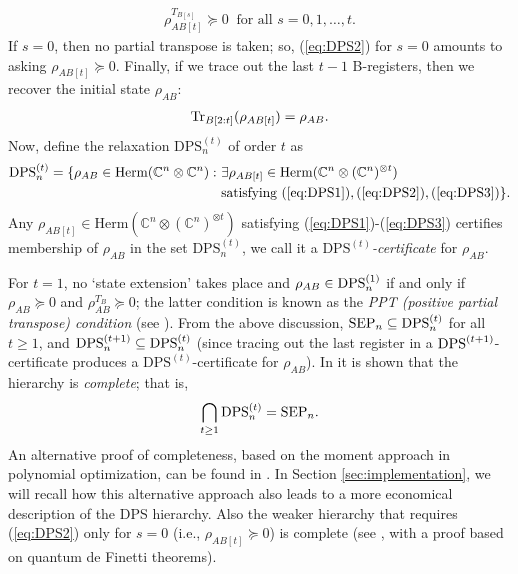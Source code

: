 \documentclass[11pt]{article}
\newcommand{\C}{\ensuremath{\mathbb{C}}} %
\newcommand{\Herm}{\mathrm{Herm}}
\newcommand{\Cnn}{\C^n\ot \C^n}
\newcommand{\Cnnt}{\C^n\ot (\C^n)^{\ot t}}
\newcommand{\SEP}{\text{\rm SEP}}
\newcommand{\DPS}{\text{\rm DPS}}
\newcommand{\DPSt}{\mathrm{DPS}^{(t)}}
\newcommand{\Tr}{\text{\rm Tr}}
\newcommand{\ot}{\otimes}
\theoremstyle{plain}
\begin{document}
\begin{align}\label{eq:DPS2}
\rho_{AB[t]}^{T_{B[s]}}\succeq 0  \ \text{ for all } s=0,1,\ldots,t.
\end{align}
If $s=0$, then  no partial transpose is taken; so, (\ref{eq:DPS2}) for $s=0$ amounts to asking $\rho_{AB[t]}\succeq 0$.
Finally, if we trace out the last $t-1$  B-registers, then we recover the initial state $\rho_{AB}$:
\begin{align}\label{eq:DPS3}
\Tr_{B[2:t]}(\rho_{AB[t]}) = \rho_{AB}.
\end{align}
 Now, define the relaxation $\DPSt_n$ of order $t$ as
 \begin{align}\label{eq:DPS}
 \begin{split}
 \DPSt_n=\{\rho_{AB}\in \Herm(\Cnn):  &\  \exists \rho_{AB[t]}\in \Herm (\Cnnt) \\
 &  \text{  satisfying }  (\ref{eq:DPS1}),  (\ref{eq:DPS2}), (\ref{eq:DPS3})\}.
  \end{split}
  \end{align}
Any $\rho_{AB[t]}\in\Herm(\Cnnt)$  satisfying  (\ref{eq:DPS1})-(\ref{eq:DPS3}) certifies membership of $\rho_{AB}$ in the set $\DPSt_n$, we call it  a {\em $\DPSt$-certificate} for $\rho_{AB}$. 

For $t=1$, no `state extension' takes place and $\rho_{AB}\in\DPS^{(1)}_n$ if and only if $\rho_{AB}\succeq 0$ and $\rho_{AB}^{T_B}\succeq 0$; the latter condition is known as the {\em PPT (positive partial  transpose)  condition} (see \cite{Horodecki_1996,Horodecki_1997}).
From the above discussion,  $\SEP_n\subseteq \DPSt_n$ for all $t\ge 1$, and
$\DPS^{(t+1)}_n\subseteq \DPSt_n$ (since tracing out the last register in a $\DPS^{(t+1)}$-certificate  produces a $\DPSt$-certificate for $\rho_{AB}$). In \cite{DPS_2002,DPS_2004} it is shown that the hierarchy is {\em complete}; that is, 
\begin{align}\label{eq:DPScomplete}
\bigcap_{t\ge 1}\DPSt_n=\SEP_n.
\end{align}
 An alternative proof of completeness,  based on the  moment approach in polynomial optimization, can be found in \cite{GLS_2021}. In Section \ref{sec:implementation},  we will recall how this alternative approach also leads to a more economical  description of the DPS hierarchy.
Also the weaker hierarchy that requires (\ref{eq:DPS2}) only for $s=0$ (i.e., $\rho_{AB[t]}\succeq 0$)  is complete  (see \cite{CKMR_2007}, with  a proof   based on  quantum de Finetti theorems).  
\end{document}
